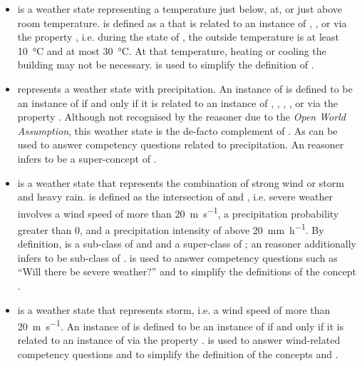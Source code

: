 \begin{itemize}
  \item {} is a weather state representing a temperature just below, at, or just above room temperature.  is defined as a  that is related to an instance of , , or  via the property , i.e. during the state of , the outside temperature is at least \SI{10}{\celsius} and at most \SI{30}{\celsius}. At that temperature, heating or cooling the building may not be necessary.  is used to simplify the definition of .
  
  \item {} represents a weather state with precipitation. An instance of  is defined to be an instance of  if and only if it is related to an instance of , , , , or  via the property . Although not recognised by the  reasoner due to the \emph{Open World Assumption}, this weather state is the de-facto complement of . As  can be used to answer competency questions related to precipitation. An  reasoner infers  to be a super-concept of .

  \item {} is a weather state that represents the combination of strong wind or storm and heavy rain.  is defined as the intersection of  and , i.e. severe weather involves a wind speed of more than \SI{20}{\metre\per\second}, a precipitation probability greater than \num{0}, and a precipitation intensity of above \SI{20}{\milli\metre\per\hour}. By definition,  is a sub-class of  and  and a super-class of ; an  reasoner additionally infers  to be sub-class of .  is used to answer competency questions such as ``Will there be severe weather?'' and to simplify the definitions of the concept .
  
  \item {} is a weather state that represents storm, i.e. a wind speed of more than \SI{20}{\metre\per\second}. An instance of  is defined to be an instance of  if and only if it is related to an instance of  via the property .  is used to answer wind-related competency questions and to simplify the definition of the concepts  and .
  

\end{itemize}
